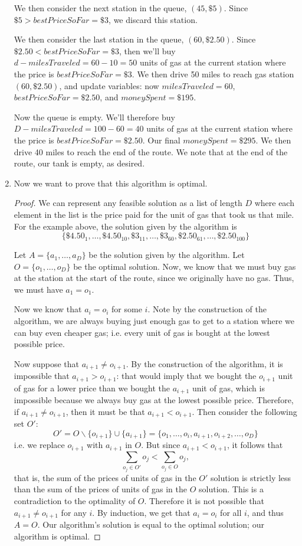 \documentclass[11pt]{article}
\begin{document}
\begin{enumerate}
We then consider the next station in the queue, $(45, \$5)$. Since $\$5>\textit{bestPriceSoFar}=\$3$, we discard this station. 

We then consider the last station in the queue, $(60, \$2.50)$. Since $\$2.50 < \textit{bestPriceSoFar}=\$3$, then we'll buy $d-\textit{milesTraveled} = 60 - 10 = 50$ units of gas at the current station where the price is $\textit{bestPriceSoFar} = \$3$. We then drive 50 miles to reach gas station $(60, \$2.50)$, and update variables: now $\textit{milesTraveled}=60$, $\textit{bestPriceSoFar}=\$2.50$, and $\textit{moneySpent} = \$195$. 

Now the queue is empty. We'll therefore buy $D-\textit{milesTraveled} = 100-60=40$ units of gas at the current station where the price is $\textit{bestPriceSoFar}=\$2.50$. Our final $\textit{moneySpent} = \$295$. We then drive 40 miles to reach the end of the route. We note that at the end of the route, our tank is empty, as desired. 

\item Now we want to prove that this algorithm is optimal. 
\begin{proof}
We can represent any feasible solution as a list of length $D$ where each element in the list is the price paid for the unit of gas that took us that mile. For the example above, the solution given by the algorithm is
\[ \{\$4.50_1, \dots, \$4.50_{10}, \$3_{11}, \dots, \$3_{60}, \$2.50_{61}, \dots, \$2.50_{100}\}\]

Let $A = \{a_1, \dots, a_D\}$ be the solution given by the algorithm. Let $O = \{o_1, \dots, o_D\}$ be the optimal solution. Now, we know that we must buy gas at the station at the start of the route, since we originally have no gas. Thus, we must have $a_1 = o_1$. 

Now we know that $a_i = o_i$ for some $i$. Note by the construction of the algorithm, we are always buying just enough gas to get to a station where we can buy even cheaper gas; i.e. every unit of gas is bought at the lowest possible price.

Now suppose that $a_{i+1} \neq o_{i+1}$. By the construction of the algorithm, it is impossible that $a_{i+1} > o_{i+1}$: that would imply that we bought the $o_{i+1}$ unit of gas for a lower price than we bought the $a_{i+1}$ unit of gas, which is impossible because we always buy gas at the lowest possible price. Therefore, if $a_{i+1}\neq o_{i+1}$, then it must be that $a_{i+1} < o_{i+1}$. Then consider the following set $O'$:
\[ O' = O \backslash \{o_{i+1}\} \cup \{a_{i+1}\}  =  \{o_1, \dots, o_i, a_{i+1}, o_{i+2}, \dots, o_D\}\]
i.e. we replace $o_{i+1}$ with $a_{i+1}$ in $O$. But since $a_{i+1} < o_{i+1}$, it follows that
\[\sum_{o_j \in O'}o_j < \sum_{o_j \in O}o_j,\]
that is, the sum of the prices of units of gas in the $O'$ solution is strictly less than the sum of the prices of units of gas in the $O$ solution. This is a contradiction to the optimality of $O$. Therefore it is not possible that $a_{i+1} \neq o_{i+1}$ for any $i$. By induction, we get that $a_i = o_i$ for all $i$, and thus $A = O$. Our algorithm's solution is equal to the optimal solution; our algorithm is optimal. 
\end{proof}


\end{enumerate}
\end{document}
